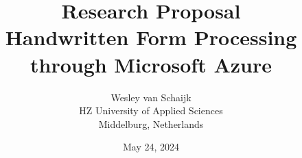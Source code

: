 \documentclass{article}
\title{Research Proposal \\ Handwritten Form Processing through Microsoft Azure}
\author{Wesley van Schaijk \\ HZ University of Applied Sciences \\ Middelburg, Netherlands}
\date{May 24, 2024}
\begin{document}
\maketitle

\begin{multicols}{2}
    
    
    
\end{multicols}

{
    \newpage
    \raggedright
    
    
}
\end{document}
